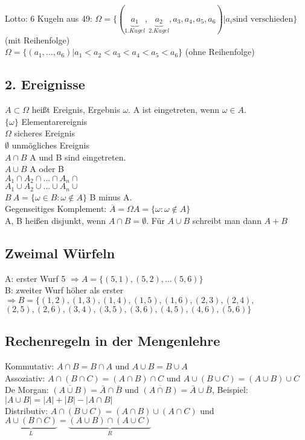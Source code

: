 Lotto: 6 Kugeln aus 49: $ \Omega=\{(\underbrace{a_1}_{1. Kugel}, \underbrace{a_2}_{2. Kugel}, a_3, a_4, a_5, a_6) | a_i \textrm{sind verschieden} \}$ (mit Reihenfolge)\\
$ \Omega=\{(a_1,...,a_6) | a_1 < a_2 < a_3 < a_4 < a_5 < a_6\}$ (ohne Reihenfolge)\\

\subsection{2. Ereignisse}
$ A \subset \Omega$ heißt Ereignis, Ergebnis $ \omega $. A ist eingetreten, wenn $\omega \in A$. \\
$\{\omega\} $ Elementarereignis\\
$ \Omega $ sicheres Ereignis\\
$\emptyset $ unmögliches Ereignis\\
$A \cap B$ A und B sind eingetreten.\\
$A\cup B$ A oder B\\
$A_1\cap A_2\cap ... \cap A_n\cap$\\
$A_1\cup A_2\cup ... \cup A_n\cup$\\
$B \ A= \{\omega \in B : \omega \notin A \} $ B minus A. \\
Gegenseitiges Komplement: $ \overline{A} = \Omega A = \{\omega : \omega \notin A \}$\\
A, B heißen disjunkt, wenn $ A \cap B = \emptyset $. Für $ A \cup B $ schreibt man dann $A+B$\\

\subsection{Zweimal Würfeln}
A: erster Wurf 5 $\Rightarrow A=\{(5,1),(5,2),...(5,6)\}$\\
B: zweiter Wurf höher als erster 
$\Rightarrow B = \{ (1,2), (1,3), (1,4), (1,5), (1,6), (2,3), (2,4), $
$(2,5), (2,6), (3,4), (3,5), (3,6), (4,5), (4,6), (5,6) \} $

\subsection{Rechenregeln in der Mengenlehre}
Kommutativ: $ A\cap B = B\cap A $ und $ A\cup B = B\cup A $\\
Assoziativ: $ A\cap (B\cap C) = (A\cap B) \cap C$ und $ A\cup (B\cup C) = (A\cup B) \cup C$ \\
De Morgan: $ \overline{(A\cup B)} = \bar{A}\cap \bar{B} $ und $ \overline{(A\cap B)} = \bar{A} \cup \bar{B}$, Beispiel: $ |A\cup B| = |A|+|B|-|A\cap B|$ \\
Distributiv: $ A \cap (B\cup C) = (A\cap B)\cup (A\cap C)$ und $ \underbrace{A\cup (B\cap C)}_{L} = \underbrace{(A\cup B) \cap (A\cup C)}_{R}$

